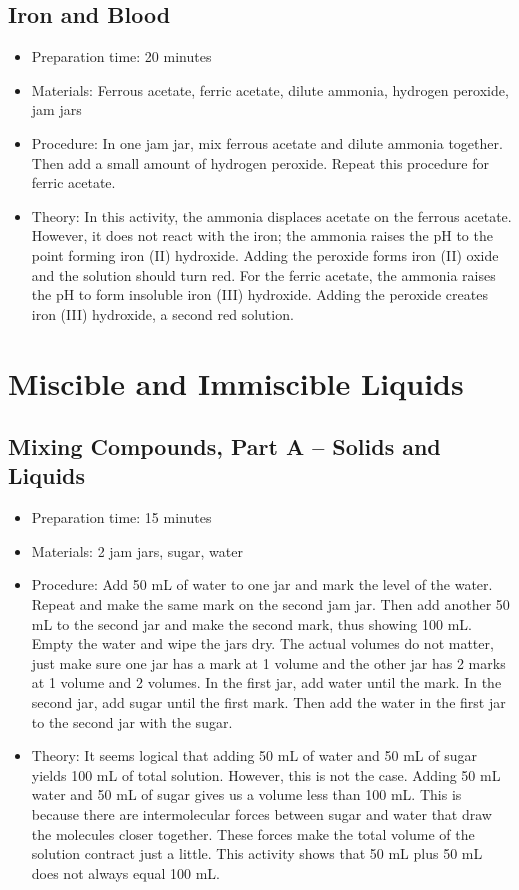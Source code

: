 \subsection{Iron and Blood}
\begin{itemize}
\item{Preparation time: 20 minutes}
\item{Materials: Ferrous acetate, ferric acetate, dilute ammonia, hydrogen peroxide, jam jars}
\item{Procedure: In one jam jar, mix ferrous acetate and dilute ammonia together. Then add a small amount of hydrogen peroxide. Repeat this procedure for ferric acetate.}
\item{Theory: In this activity, the ammonia displaces acetate on the ferrous acetate. However, it does not react with the iron; the ammonia raises the pH to the point forming iron (II) hydroxide. Adding the peroxide forms iron (II) oxide and the solution should turn red. For the ferric acetate, the ammonia raises the pH to form insoluble iron (III) hydroxide. Adding the peroxide creates iron (III) hydroxide, a second red solution.}
\end{itemize}

\section{Miscible and Immiscible Liquids}

\subsection{Mixing Compounds, Part A – Solids and Liquids}
\begin{itemize}
\item{Preparation time: 15 minutes}
\item{Materials: 2 jam jars, sugar, water}
\item{Procedure: Add 50 mL of water to one jar and mark the level of the water. Repeat and make the same mark on the second jam jar. Then add another 50 mL to the second jar and make the second mark, thus showing 100 mL. Empty the water and wipe the jars dry. The actual volumes do not matter, just make sure one jar has a mark at 1 volume and the other jar has 2 marks at 1 volume and 2 volumes. In the first jar, add water until the mark. In the second jar, add sugar until the first mark. Then add the water in the first jar to the second jar with the sugar. }
\item{Theory: It seems logical that adding 50 mL of water and 50 mL of sugar yields 100 mL of total solution. However, this is not the case. Adding 50 mL water and 50 mL of sugar gives us a volume less than 100 mL. This is because there are intermolecular forces between sugar and water that draw the molecules closer together. These forces make the total volume of the solution contract just a little. This activity shows that 50 mL plus 50 mL does not always equal 100 mL. }
\end{itemize}

